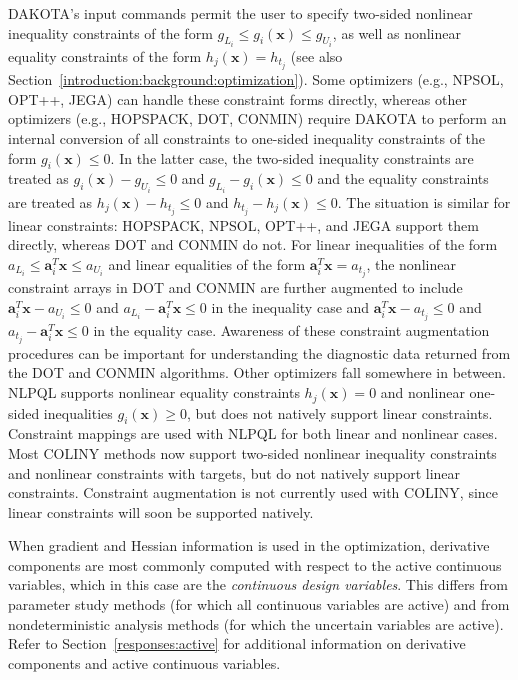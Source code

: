 DAKOTA's input commands permit the user to specify two-sided nonlinear
inequality constraints of the form $g_{L_{i}} \leq g_{i}(\mathbf{x})
\leq g_{U_{i}}$, as well as nonlinear equality constraints of the form
$h_{j}(\mathbf{x}) = h_{t_{j}}$ (see also
Section~\ref{introduction:background:optimization}). Some optimizers
(e.g., NPSOL, OPT++, JEGA) can handle these constraint forms directly,
whereas other optimizers (e.g., HOPSPACK, DOT, CONMIN) require DAKOTA
to perform an internal conversion of all constraints to one-sided
inequality constraints of the form $g_{i}(\mathbf{x}) \leq 0$. In the
latter case, the two-sided inequality constraints are treated as
$g_{i}(\mathbf{x}) - g_{U_{i}} \leq 0$ and $g_{L_{i}} -
g_{i}(\mathbf{x}) \leq 0$ and the equality constraints are treated as
$h_{j}(\mathbf{x}) - h_{t_{j}} \leq 0$ and $h_{t_{j}} -
h_{j}(\mathbf{x}) \leq 0$. The situation is similar for linear
constraints: HOPSPACK, NPSOL, OPT++, and JEGA support them directly,
whereas DOT and CONMIN do not.  For linear inequalities of the form
$a_{L_{i}} \leq \mathbf{a}_{i}^{T}\mathbf{x} \leq a_{U_{i}}$ and
linear equalities of the form $\mathbf{a}_{i}^{T}\mathbf{x} =
a_{t_{j}}$, the nonlinear constraint arrays in DOT and CONMIN are
further augmented to include $\mathbf{a}_{i}^{T}\mathbf{x} - a_{U_{i}}
\leq 0$ and $a_{L_{i}} - \mathbf{a}_{i}^{T}\mathbf{x} \leq 0$ in the
inequality case and $\mathbf{a}_{i}^{T}\mathbf{x} - a_{t_{j}} \leq 0$
and $a_{t_{j}} - \mathbf{a}_{i}^{T}\mathbf{x} \leq 0$ in the equality
case. Awareness of these constraint augmentation procedures can be
important for understanding the diagnostic data returned from the DOT
and CONMIN algorithms.  Other optimizers fall somewhere in between.
NLPQL supports nonlinear equality constraints $h_{j}(\mathbf{x}) = 0$
and nonlinear one-sided inequalities $g_{i}(\mathbf{x}) \geq 0$, but
does not natively support linear constraints.  Constraint mappings are
used with NLPQL for both linear and nonlinear cases.  Most COLINY
methods now support two-sided nonlinear inequality constraints and
nonlinear constraints with targets, but do not natively support linear
constraints.  Constraint augmentation is not currently used with
COLINY, since linear constraints will soon be supported natively.

When gradient and Hessian information is used in the optimization,
derivative components are most commonly computed with respect to the
active continuous variables, which in this case are the
\emph{continuous design variables}. This differs from parameter study
methods (for which all continuous variables are active) and from
nondeterministic analysis methods (for which the uncertain variables
are active).  Refer to Section~\ref{responses:active} for additional
information on derivative components and active continuous variables.

